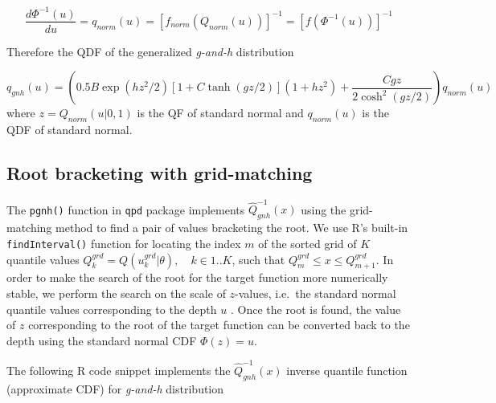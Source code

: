 \documentclass[
  12pt,
]{article}
\begin{document}
\[\frac{d\Phi^{-1}(u)}{du}=q_{norm}(u)=[f_{norm}(Q_{norm}(u))]^{-1}=[f(\Phi^{-1}(u))]^{-1}\]

Therefore the QDF of the generalized \emph{g-and-h} distribution

\[
q_{gnh}(u)=\left(0.5B\exp(hz^2/2)[1+C\tanh(gz/2)](1+hz^2)+ \frac{Cgz}{2\cosh^2(gz/2)}\right)q_{norm}(u)
\]
where \(z=Q_{norm}(u|0,1)\) is the QF of standard normal and \(q_{norm}(u)\) is the QDF of standard normal.

\hypertarget{root-bracketing-with-grid-matching}{%
\subsection{Root bracketing with grid-matching}\label{root-bracketing-with-grid-matching}}

The \texttt{pgnh()} function in \texttt{qpd} package \citep{perepolkin2019QpdToolsQuantileparameterized} implements \(\widehat{Q}^{-1}_{gnh}(x)\) using the grid-matching method to find a pair of values bracketing the root. We use R's built-in \texttt{findInterval()} function for locating the index \(m\) of the sorted grid of \(K\) quantile values \(Q^{grd}_k=Q(u^{grd}_k|\theta), \quad k \in 1..K\), such that \(Q^{grd}_{m} \leq x \leq Q^{grd}_{m+1}\). In order to make the search of the root for the target function more numerically stable, we perform the search on the scale of \(z\)-values, i.e.~the standard normal quantile values corresponding to the depth \(u\) \citep{rayner2002NumericalMaximumLikelihood}. Once the root is found, the value of \(z\) corresponding to the root of the target function can be converted back to the depth using the standard normal CDF \(\Phi(z)=u\).

The following R code snippet implements the \(\widehat Q^{-1}_{gnh}(x)\) inverse quantile function (approximate CDF) for \emph{g-and-h} distribution
\end{document}
